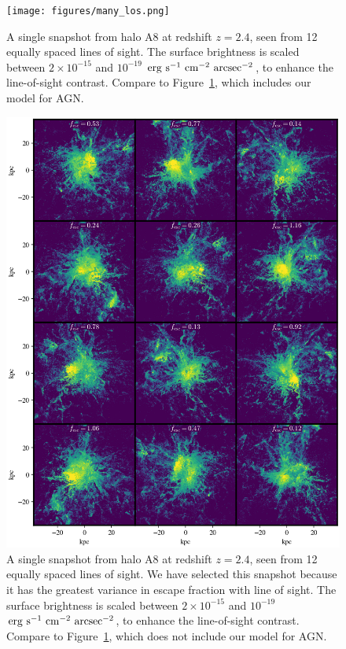 \begin{figure}
    \centering
    \texttt{[image: figures/many\_los.png]}
    \caption{
        A single snapshot from halo A8 at redshift $z=2.4$, seen from 12 equally spaced lines of sight.
        The surface brightness is scaled between $2\times10^{-15}$ and $10^{-19}$ $\rm{erg}\ \rm{s}^{-1}\ \rm{cm}^{-2}\ \rm{arcsec}^{-2}$, to enhance the line-of-sight contrast.
        Compare to Figure~\ref{fig:many_los}, which includes our model for AGN.
    }
    \label{fig:many_los}
\end{figure}

\begin{figure}
    \centering
    \includegraphics[width=\textwidth,height=\textheight,keepaspectratio]{figures/agn_many_los.png}
    \caption{
        A single snapshot from halo A8 at redshift $z=2.4$, seen from 12 equally spaced lines of sight.
        We have selected this snapshot because it has the greatest variance in escape fraction with line of sight.
        The surface brightness is scaled between $2\times10^{-15}$ and $10^{-19}$ $\rm{erg}\ \rm{s}^{-1}\ \rm{cm}^{-2}\ \rm{arcsec}^{-2}$, to enhance the line-of-sight contrast.
        Compare to Figure~\ref{fig:many_los}, which does not include our model for AGN.
    }
    \label{fig:agn_many_los}
\end{figure}


